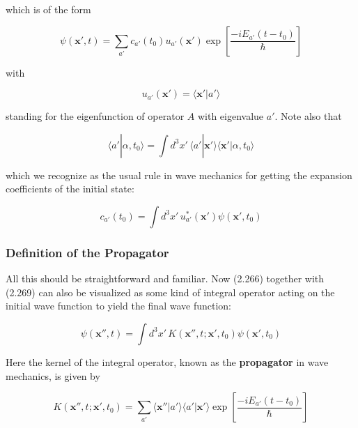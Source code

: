 \documentclass[11pt,a4paper]{article}
\begin{document}
which is of the form

\begin{equation}
\psi(\mathbf{x}', t) = \sum_{a'} c_{a'}(t_0) u_{a'}(\mathbf{x}') \exp\left[\frac{-iE_{a'}(t - t_0)}{\hbar}\right]
\tag{2.267}
\end{equation}

with

\begin{equation}
u_{a'}(\mathbf{x}') = \langle \mathbf{x}'|a'\rangle
\tag{2.268}
\end{equation}

standing for the eigenfunction of operator $A$ with eigenvalue $a'$. Note also that

\begin{equation}
\langle a'|\alpha, t_0\rangle = \int d^3x'\,\langle a'|\mathbf{x}'\rangle\langle \mathbf{x}'|\alpha, t_0\rangle
\tag{2.269}
\end{equation}

which we recognize as the usual rule in wave mechanics for getting the expansion coefficients of the initial state:

\begin{equation}
c_{a'}(t_0) = \int d^3x'\,u_{a'}^*(\mathbf{x}')\psi(\mathbf{x}', t_0)
\tag{2.270}
\end{equation}

\subsubsection{Definition of the Propagator}

All this should be straightforward and familiar. Now (2.266) together with (2.269) can also be visualized as some kind of integral operator acting on the initial wave function to yield the final wave function:

\begin{equation}
\boxed{\psi(\mathbf{x}'', t) = \int d^3x'\,K(\mathbf{x}'', t; \mathbf{x}', t_0)\psi(\mathbf{x}', t_0)}
\tag{2.271}
\end{equation}

Here the kernel of the integral operator, known as the \textbf{propagator} in wave mechanics, is given by

\begin{equation}
\boxed{K(\mathbf{x}'', t; \mathbf{x}', t_0) = \sum_{a'} \langle \mathbf{x}''|a'\rangle\langle a'|\mathbf{x}'\rangle \exp\left[\frac{-iE_{a'}(t - t_0)}{\hbar}\right]}
\tag{2.272}
\end{equation}
\end{document}
